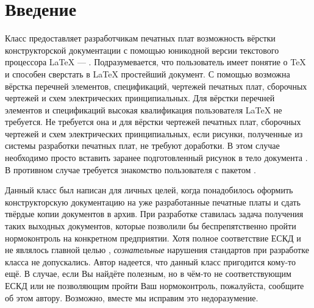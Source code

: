 
\section{Введение}

Класс  предоставляет разработчикам печатных плат возможность
вёрстки конструкторской документации с помощью юникодной версии текстового
процессора \LaTeX{} --- \XeLaTeX{}. Подразумевается, что пользователь
имеет понятие о \TeX{} и способен сверстать в \LaTeX{} простейший
документ. С помощью  возможна вёрстка перечней элементов,
спецификаций, чертежей печатных плат, сборочных чертежей и схем электрических
принципиальных. Для вёрстки перечней элементов и спецификаций высокая
квалификация пользователя \LaTeX{} не требуется. Не требуется она и для
вёрстки чертежей печатных плат, сборочных чертежей и схем электрических
принципиальных, если рисунки, полученные из системы разработки печатных плат, не
требуют доработки. В этом случае необходимо просто вставить заранее
подготовленный рисунок в тело документа . В противном случае
требуется знакомство пользователя с пакетом .

Данный класс был написан для личных целей, когда понадобилось оформить
конструкторскую документацию на уже разработанные печатные платы и сдать твёрдые
копии документов в архив. При разработке  ставилась задача
получения таких выходных документов, которые позволили бы беспрепятственно
пройти нормоконтроль на конкретном предприятии. Хотя полное соответствие ЕСКД и
не являлось главной целью , \emph{сознательные} нарушения
стандартов при разработке класса не допускались. Автор надеется, что данный
класс пригодится кому-то ещё. В случае, если Вы найдёте 
полезным, но в чём-то не соответствующим ЕСКД или не позволяющим пройти Ваш
нормоконтроль, пожалуйста, сообщите об этом автору. Возможно, вместе мы исправим
это недоразумение.
